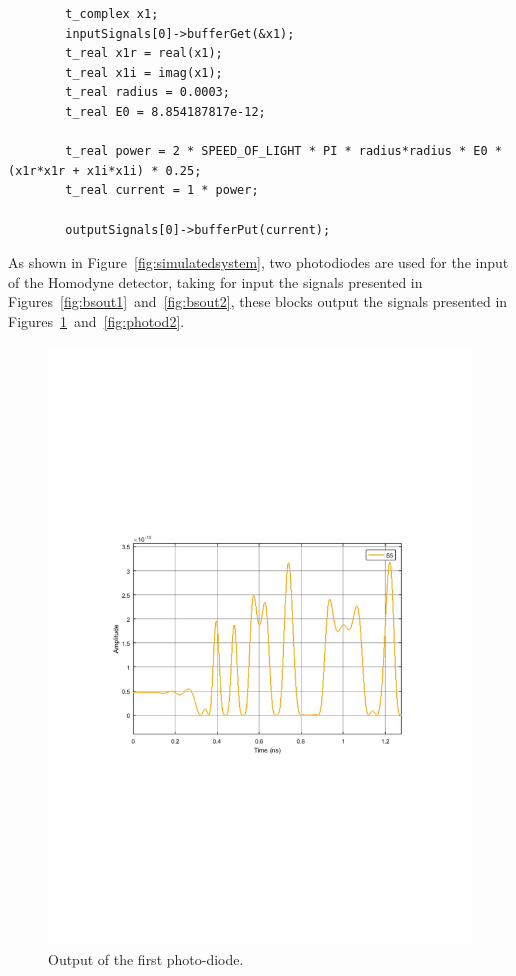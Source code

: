 \documentclass{article}
\begin{document}
\begin{verbatim}
		t_complex x1;
		inputSignals[0]->bufferGet(&x1);
		t_real x1r = real(x1);
		t_real x1i = imag(x1);
		t_real radius = 0.0003;
		t_real E0 = 8.854187817e-12;

		t_real power = 2 * SPEED_OF_LIGHT * PI * radius*radius * E0 * (x1r*x1r + x1i*x1i) * 0.25;
		t_real current = 1 * power;

		outputSignals[0]->bufferPut(current);
\end{verbatim}

As shown in Figure~\ref{fig:simulatedsystem}, two photodiodes are used for the input of the Homodyne detector, taking for input the signals presented in Figures~\ref{fig:bsout1}~and~\ref{fig:bsout2}, these blocks output the signals presented in Figures~\ref{fig:photod1}~and~\ref{fig:photod2}.

\begin{figure}[H]
\centering
\includegraphics[width=\linewidth, trim= 0mm 100mm 0mm 100mm, clip]{photod1.pdf}
\caption{Output of the first photo-diode.}
\label{fig:photod1}
\end{figure}
\end{document}

